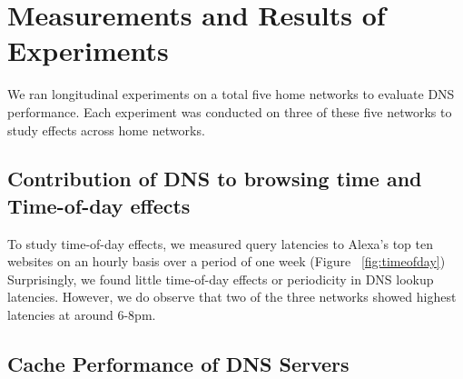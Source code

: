 \documentclass[twocolumn]{article}
\begin{document}
\section{Measurements and Results of Experiments}
\label{sec:results}
We ran longitudinal experiments on a total five home networks to evaluate DNS performance. Each experiment was conducted on three of these five networks to study effects across home networks.
\subsection{Contribution of DNS to browsing time and Time-of-day effects}
To study time-of-day effects, we measured query latencies to Alexa's top ten websites on an hourly basis over a period of one week (Figure ~\ref{fig:timeofday}) Surprisingly, we found little time-of-day effects or periodicity in DNS lookup latencies.
However, we do observe that two of the three networks showed highest latencies at around 6-8pm.
\subsection{Cache Performance of DNS Servers}
\end{document}
